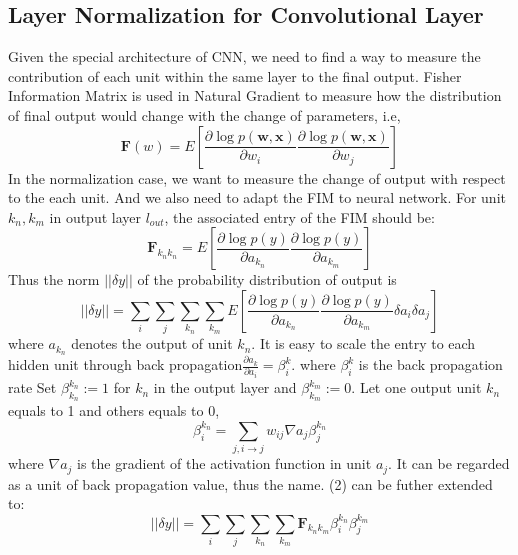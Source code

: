 \documentclass{sig-alternate}
\begin{document}
    \subsection{Layer Normalization for Convolutional Layer}
    Given the special architecture of CNN, we need to find a way to measure the contribution of each unit within the same layer to the final output. Fisher Information Matrix is used in Natural Gradient to measure how the distribution of final output would change with the change of parameters, i.e, 
    \begin{displaymath}\pmb{F}(w)=E[\frac{\partial\log p(\pmb{w,x})}{\partial w_i}\frac{\partial\log p(\pmb{w,x})}{\partial w_j}] 
    \end{displaymath}
    In the normalization case, we want to measure the change of output with respect to the each unit. And we also need to adapt the FIM to neural network. For unit $k_n, k_m$ in output layer $l_{out}$, the associated entry of the FIM should be:
    \begin{equation}
        \pmb{F}_{k_nk_n} = E[\frac{\partial\log p(y)}{\partial a_{k_n}}\frac{\partial\log p(y)}{\partial a_{k_m}}]
    \end{equation}
    Thus the norm $||\delta y||$ of the probability distribution of output is 
    \begin{equation}
        ||\delta y|| = \sum_i\sum_j\sum_{k_n}\sum_{k_m}E[\frac{\partial\log p(y)}{\partial a_{k_n}}\frac{\partial\log p(y)}{\partial a_{k_m}}\delta a_i\delta a_j]
    \end{equation}
    where $a_{k_n}$ denotes the output of unit $k_n$.
    It is easy to scale the entry to each hidden unit through back propagation$\frac{\partial a_k}{\partial a_i}=\beta_i^{k}$.
    where $\beta_i^{k}$ is the back propagation rate\cite{LeCun1998}
    Set $\beta_{k_n}^{k_n}:=1$ for $k_n$ in the output layer and $\beta_{k_m}^{k_m}:=0$. Let one output unit $k_n$ equals to 1 and others equals to 0, 
    \begin{equation}
        \beta_{i}^{k_n} = \sum_{j, i\rightarrow j}w_{ij}\nabla a_j \beta_j^{k_n} 
    \end{equation}
    where $\nabla a_j$ is the gradient of the activation function in unit $a_j$. It can be regarded as a unit of back propagation value, thus the name. 
    (2) can be futher extended to:
    \begin{equation}
        ||\delta y|| = \sum_i\sum_j\sum_{k_n}\sum_{k_m}\pmb{F}_{k_nk_m}\beta_i^{k_n}\beta_j^{k_m}
    \end{equation}
\end{document}
